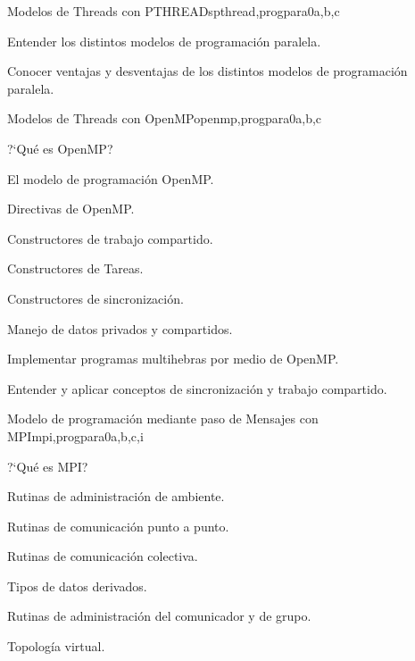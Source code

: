 \begin{syllabus}
\begin{unit}{Modelos de Threads con PTHREADs}{}{pthread,progpara}{0}{a,b,c}
\begin{learningoutcomes}
	\item Entender los distintos modelos de programación paralela.
	\item Conocer ventajas y desventajas de los distintos modelos de programación paralela.
\end{learningoutcomes}
\end{unit}

\begin{unit}{Modelos de Threads con OpenMP}{}{openmp,progpara}{0}{a,b,c}
\begin{topics}
         \item ?`Qué es OpenMP?
         \item El modelo de programación OpenMP.
         \item Directivas de OpenMP.
         \item Constructores de trabajo compartido.
         \item Constructores de Tareas.
         \item Constructores de sincronización.
	 \item Manejo de datos privados y compartidos.
\end{topics}

\begin{learningoutcomes}
	\item Implementar programas multihebras por medio de OpenMP.
	\item Entender y aplicar conceptos de sincronización y trabajo compartido.
\end{learningoutcomes}
\end{unit}

\begin{unit}{Modelo de programación mediante paso de Mensajes con MPI}{}{mpi,progpara}{0}{a,b,c,i}
\begin{topics}
         \item ?`Qué es MPI?
         \item Rutinas de administración de ambiente.
         \item Rutinas de comunicación punto a punto.
         \item Rutinas de comunicación colectiva.
         \item Tipos de datos derivados.
         \item Rutinas de administración del comunicador y de grupo.
	 \item Topología virtual.
\end{topics}


\end{unit}
\end{syllabus}
